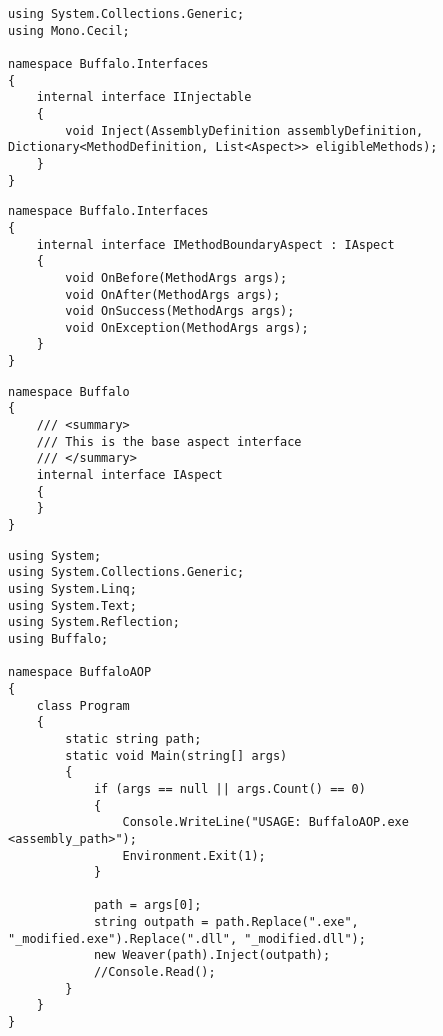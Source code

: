 \begin{lstlisting}[caption={../buffalo/Interfaces/IInjectable.cs}, label=../buffalo/Interfaces/IInjectable.cs, frame=tb, basicstyle=\scriptsize]﻿using System.Collections.Generic;
using Mono.Cecil;

namespace Buffalo.Interfaces
{
    internal interface IInjectable
    {
        void Inject(AssemblyDefinition assemblyDefinition, Dictionary<MethodDefinition, List<Aspect>> eligibleMethods);
    }
}
\end{lstlisting}

\begin{lstlisting}[caption={../buffalo/Interfaces/IMethodBoundaryAspect.cs}, label=../buffalo/Interfaces/IMethodBoundaryAspect.cs, frame=tb, basicstyle=\scriptsize]﻿namespace Buffalo.Interfaces
{
    internal interface IMethodBoundaryAspect : IAspect
    {
        void OnBefore(MethodArgs args);
        void OnAfter(MethodArgs args);
        void OnSuccess(MethodArgs args);
        void OnException(MethodArgs args);
    }
}
\end{lstlisting}

\begin{lstlisting}[caption={../buffalo/Interfaces/IAspect.cs}, label=../buffalo/Interfaces/IAspect.cs, frame=tb, basicstyle=\scriptsize]﻿namespace Buffalo
{
    /// <summary>
    /// This is the base aspect interface
    /// </summary>
    internal interface IAspect
    {
    }
}
\end{lstlisting}

\begin{lstlisting}[caption={../../buffalo/BuffaloAOP/Program.cs}, label=../../buffalo/BuffaloAOP/Program.cs, frame=tb, basicstyle=\scriptsize]﻿using System;
using System.Collections.Generic;
using System.Linq;
using System.Text;
using System.Reflection;
using Buffalo;

namespace BuffaloAOP
{
    class Program
    {
        static string path;
        static void Main(string[] args)
        {
            if (args == null || args.Count() == 0)
            {
                Console.WriteLine("USAGE: BuffaloAOP.exe <assembly_path>");
                Environment.Exit(1);
            }

            path = args[0];
            string outpath = path.Replace(".exe", "_modified.exe").Replace(".dll", "_modified.dll");
            new Weaver(path).Inject(outpath);
            //Console.Read();
        }
    }
}
\end{lstlisting}

